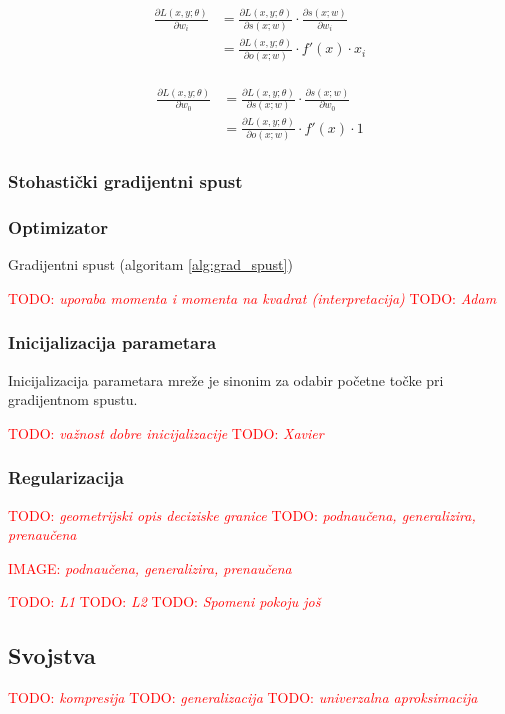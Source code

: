 \documentclass[times, utf8, diplomski]{fer}
\def\pfrac#1#2{\frac{\partial #1}{\partial #2}}
\def\TODO#1{\noindent\textcolor{red}{TODO: \textit{#1}}\newline}
\def\todo#1{\TODO{#1}}
\def\todoimg#1{\begin{center} \textcolor{red}{IMAGE: \textit{#1}} \end{center}}
\begin{document}
\begin{align} \label{eq:w_update}
\begin{split}
\pfrac{L(x,y;\theta)}{w_i} &= \pfrac{L(x,y;\theta)}{s(x;w)} \cdot \pfrac{s(x;w)}{w_i} \\
&= \pfrac{L(x,y;\theta)}{o(x;w)} \cdot f'(x) \cdot x_i
\end{split}
\end{align}

\begin{align}
\begin{split}
\pfrac{L(x,y;\theta)}{w_0} &= \pfrac{L(x,y;\theta)}{s(x;w)} \cdot \pfrac{s(x;w)}{w_0} \\
&= \pfrac{L(x,y;\theta)}{o(x;w)} \cdot f'(x) \cdot 1
\end{split}
\end{align}

\subsubsection{Stohastički gradijentni spust}

\subsubsection{Optimizator}
Gradijentni spust (algoritam \ref{alg:grad_spust}) 

\todo{uporaba momenta i momenta na kvadrat (interpretacija)}
\todo{Adam}

\subsubsection{Inicijalizacija parametara}
Inicijalizacija parametara mreže je sinonim za odabir početne točke pri gradijentnom spustu.

\todo{važnost dobre inicijalizacije}
\todo{Xavier}

\subsubsection{Regularizacija}
\todo{geometrijski opis deciziske granice}
\todo{podnaučena, generalizira, prenaučena}
\todoimg{podnaučena, generalizira, prenaučena}
\todo{L1}
\todo{L2}
\todo{Spomeni pokoju još}

\subsection{Svojstva}
\todo{kompresija}
\todo{generalizacija}
\todo{univerzalna aproksimacija}
\end{document}
